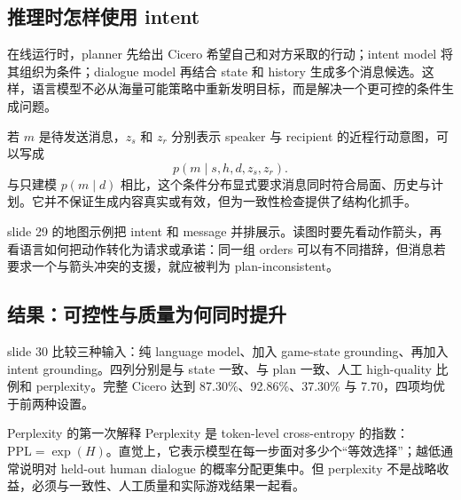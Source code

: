 \subsection{推理时怎样使用 intent}

在线运行时，planner 先给出 Cicero 希望自己和对方采取的行动；intent model 将其组织为条件；dialogue model 再结合 state 和 history 生成多个消息候选。这样，语言模型不必从海量可能策略中重新发明目标，而是解决一个更可控的条件生成问题。


若 $m$ 是待发送消息，$z_s$ 和 $z_r$ 分别表示 speaker 与 recipient 的近程行动意图，可以写成
\begin{equation}
p(m\mid s,h,d,z_s,z_r).
\end{equation}
与只建模 $p(m\mid d)$ 相比，这个条件分布显式要求消息同时符合局面、历史与计划。它并不保证生成内容真实或有效，但为一致性检查提供了结构化抓手。

slide 29 的地图示例把 intent 和 message 并排展示。读图时要先看动作箭头，再看语言如何把动作转化为请求或承诺：同一组 orders 可以有不同措辞，但消息若要求一个与箭头冲突的支援，就应被判为 plan-inconsistent。


\subsection{结果：可控性与质量为何同时提升}

slide 30 比较三种输入：纯 language model、加入 game-state grounding、再加入 intent grounding。四列分别是与 state 一致、与 plan 一致、人工 high-quality 比例和 perplexity。完整 Cicero 达到 87.30\%、92.86\%、37.30\% 与 7.70，四项均优于前两种设置。


\begin{knowledgebox}{Perplexity 的第一次解释}
Perplexity 是 token-level cross-entropy 的指数：$\mathrm{PPL}=\exp(H)$。直觉上，它表示模型在每一步面对多少个“等效选择”；越低通常说明对 held-out human dialogue 的概率分配更集中。但 perplexity 不是战略收益，必须与一致性、人工质量和实际游戏结果一起看。
\end{knowledgebox}

